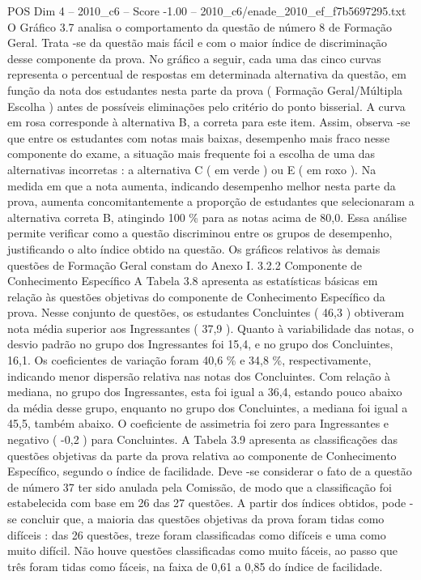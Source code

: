 \begin{textsample}{POS Dim 4 – 2010\_c6 – Score -1.00 – 2010\_c6/enade\_2010\_ef\_f7b5697295.txt}
O Gráfico 3.7 analisa o comportamento da questão de número 8 de Formação Geral.
Trata -se da questão mais fácil e com o maior índice de discriminação desse componente da prova.
No gráfico a seguir, cada uma das cinco curvas representa o percentual de respostas em determinada alternativa da questão, em função da nota dos estudantes nesta parte da prova ( Formação Geral/Múltipla Escolha ) antes de possíveis eliminações pelo critério do ponto bisserial.
A curva em rosa corresponde à alternativa B, a correta para este item.
Assim, observa -se que entre os estudantes com notas mais baixas, desempenho mais fraco nesse componente do exame, a situação mais frequente foi a escolha de uma das alternativas incorretas : a alternativa C ( em verde ) ou E ( em roxo ).
Na medida em que a nota aumenta, indicando desempenho melhor nesta parte da prova, aumenta concomitantemente a proporção de estudantes que selecionaram a alternativa correta B, atingindo 100 \% para as notas acima de 80,0.
Essa análise permite verificar como a questão discriminou entre os grupos de desempenho, justificando o alto índice obtido na questão.
Os gráficos relativos às demais questões de Formação Geral constam do Anexo I. 3.2.2 Componente de Conhecimento Específico A Tabela 3.8 apresenta as estatísticas básicas em relação às questões objetivas do componente de Conhecimento Específico da prova.
Nesse conjunto de questões, os estudantes Concluintes ( 46,3 ) obtiveram nota média superior aos Ingressantes ( 37,9 ).
Quanto à variabilidade das notas, o desvio padrão no grupo dos Ingressantes foi 15,4, e no grupo dos Concluintes, 16,1.
Os coeficientes de variação foram 40,6 \% e 34,8 \%, respectivamente, indicando menor dispersão relativa nas notas dos Concluintes.
Com relação à mediana, no grupo dos Ingressantes, esta foi igual a 36,4, estando pouco abaixo da média desse grupo, enquanto no grupo dos Concluintes, a mediana foi igual a 45,5, também abaixo.
O coeficiente de assimetria foi zero para Ingressantes e negativo ( -0,2 ) para Concluintes.
A Tabela 3.9 apresenta as classificações das questões objetivas da parte da prova relativa ao componente de Conhecimento Específico, segundo o índice de facilidade.
Deve -se considerar o fato de a questão de número 37 ter sido anulada pela Comissão, de modo que a classificação foi estabelecida com base em 26 das 27 questões.
A partir dos índices obtidos, pode -se concluir que, a maioria das questões objetivas da prova foram tidas como difíceis : das 26 questões, treze foram classificadas como difíceis e uma como muito difícil.
Não houve questões classificadas como muito fáceis, ao passo que três foram tidas como fáceis, na faixa de 0,61 a 0,85 do índice de facilidade.

\end{textsample}
